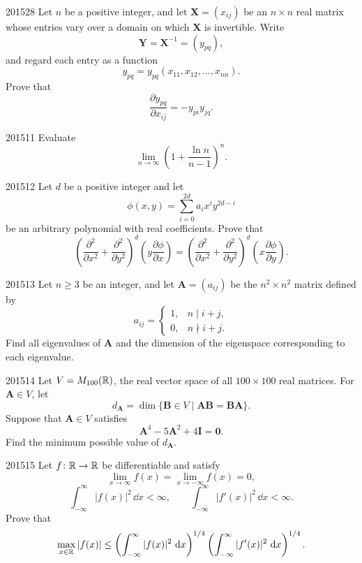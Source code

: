 \begin{problem}{2015}{2}{8}
Let $n$ be a positive integer, and let $\mathbf X=(x_{ij})$ be an $n\times n$ real matrix whose entries vary over a domain on which $\mathbf X$ is invertible. Write
\[
    \mathbf Y=\mathbf X^{-1}=(y_{pq}),
\]
and regard each entry as a function
\[
    y_{pq}=y_{pq}(x_{11}, x_{12}, \dots, x_{nn}).
\]
Prove that
\[
    \frac{\partial y_{pq}}{\partial x_{ij}}
    =-y_{pi}y_{jq}.
\]
\end{problem}

\begin{problem}{2015}{1}{1}
Evaluate
\[
    \lim_{n\to\infty}
    \left(1+\frac{\ln n}{n-1}\right)^n.
\]
\end{problem}

\begin{problem}{2015}{1}{2}
Let $d$ be a positive integer and let
\[
    \phi(x, y)=\sum_{i=0}^{2d}a_i x^i y^{2d-i}
\]
be an arbitrary polynomial with real coefficients. Prove that
\[
    \left(\frac{\partial^2}{\partial x^2}
    +\frac{\partial^2}{\partial y^2}\right)^d
    \left(y\frac{\partial\phi}{\partial x}\right)
    =
    \left(\frac{\partial^2}{\partial x^2}
    +\frac{\partial^2}{\partial y^2}\right)^d
    \left(x\frac{\partial\phi}{\partial y}\right).
\]
\end{problem}

\begin{problem}{2015}{1}{3}
Let $n\ge3$ be an integer, and let $\mathbf A=(a_{ij})$ be the $n^2\times n^2$ matrix defined by
\[
    a_{ij}
    =
    \begin{cases}
        1, & n\mid i+j, \\
        0, & n\nmid i+j.
    \end{cases}
\]
Find all eigenvalues of $\mathbf A$ and the dimension of the eigenspace corresponding to each eigenvalue.
\end{problem}

\begin{problem}{2015}{1}{4}
Let $V=M_{100}(\mathbb{R})$, the real vector space of all $100\times100$ real matrices. For $\mathbf A\in V$, let
\[
    d_{\mathbf A}
    =\dim\{\mathbf B\in V\mid \mathbf A\mathbf B=\mathbf B\mathbf A\}.
\]
Suppose that $\mathbf A\in V$ satisfies
\[
    \mathbf A^4-5\mathbf A^2+4\mathbf I=\mathbf0.
\]
Find the minimum possible value of $d_{\mathbf A}$.
\end{problem}

\begin{problem}{2015}{1}{5}
Let $f\colon\mathbb{R}\to\mathbb{R}$ be differentiable and satisfy
\[
    \lim_{x\to\infty}f(x)
    =\lim_{x\to-\infty}f(x)=0,
\]
\[
    \int_{-\infty}^{\infty}|f(x)|^2\, \dd x<\infty,
    \qquad
    \int_{-\infty}^{\infty}|f'(x)|^2\, \dd x<\infty.
\]
Prove that
\[
    \max_{x\in\mathbb{R}}|f(x)|
    \le
    \left(\int_{-\infty}^{\infty}|f(x)|^2\, \mathop{}\!\mathrm{d} x\right)^{1/4}
    \left(\int_{-\infty}^{\infty}|f'(x)|^2\, \mathop{}\!\mathrm{d} x\right)^{1/4}.
\]
\end{problem}

